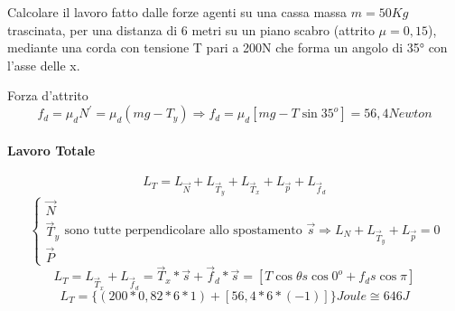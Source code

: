 \begin{esempio}
	Calcolare il lavoro fatto dalle forze agenti su una cassa massa $m=50Kg$
	trascinata, per una distanza di 6 metri su un piano scabro (attrito
	$\mu=0,15$), mediante una corda con tensione T pari a 200N che forma un
	angolo di 35° con l'asse delle x.
        \begin{center}
            \fbox
            {
            \begin{minipage}{0.75\textwidth}
                    Forza d'attrito
                    \begin{equation*}
                            f_d=\mu_d N^\prime=\mu_d(mg-T_y) \Rightarrow f_d=\mu_d[mg-T\sin
                            35^o]=56,4 Newton
                    \end{equation*}
            \end{minipage}
            }
      	\end{center}
	\paragraph{Lavoro Totale}
	\begin{equation*}
		L_T=L_{\vec{N}}+L_{\vec{T}_y} + L_{\vec{T}_x}+L_{\vec{p}} +
		L_{\vec{f}_d}
	\end{equation*}
	\begin{equation*}
		\begin{cases}
			\vec{N}\\
			\vec{T}_y\\
			\vec{P}
		\end{cases}
		\text{sono tutte perpendicolare allo spostamento } \vec{s} \Rightarrow
		L_N + L_{\vec{T}_y} + L_{\vec{p}} = 0
	\end{equation*}
	\begin{equation*}
		L_T=L_{\vec{T}_x} + L_{\vec{f}_d}=\vec{T}_x*\vec{s} + \vec{f}_d
		*\vec{s} =[T\cos \theta s \cos 0^o +f_ds\cos \pi]
	\end{equation*}
	\begin{equation*}
		L_T=\{(200*0,82*6*1)+[56,4*6*(-1)]\} Joule \cong \boxed{646J}
	\end{equation*}
\end{esempio}
